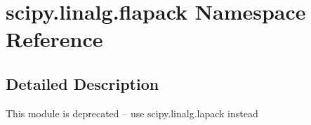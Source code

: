 \hypertarget{namespacescipy_1_1linalg_1_1flapack}{}\section{scipy.\+linalg.\+flapack Namespace Reference}
\label{namespacescipy_1_1linalg_1_1flapack}


\subsection{Detailed Description}
\begin{DoxyVerb}This module is deprecated -- use scipy.linalg.lapack instead
\end{DoxyVerb}
 